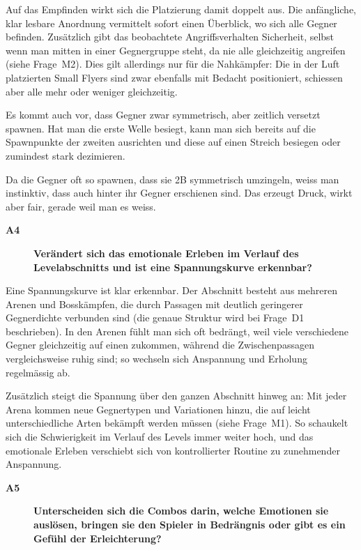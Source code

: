 \documentclass[../Main.tex]{subfiles}
\begin{document}
Auf das Empfinden wirkt sich die Platzierung damit doppelt aus. Die anfängliche, klar lesbare Anordnung vermittelt sofort einen Überblick, wo sich alle Gegner befinden. Zusätzlich gibt das beobachtete Angriffsverhalten Sicherheit, selbst wenn man mitten in einer Gegnergruppe steht, da nie alle gleichzeitig angreifen (siehe Frage~M2). Dies gilt allerdings nur für die Nahkämpfer: Die in der Luft platzierten Small Flyers sind zwar ebenfalls mit Bedacht positioniert, schiessen aber alle mehr oder weniger gleichzeitig.

Es kommt auch vor, dass Gegner zwar symmetrisch, aber zeitlich versetzt spawnen. Hat man die erste Welle besiegt, kann man sich bereits auf die Spawnpunkte der zweiten ausrichten und diese auf einen Streich besiegen oder zumindest stark dezimieren.

Da die Gegner oft so spawnen, dass sie 2B symmetrisch umzingeln, weiss man instinktiv, dass auch hinter ihr Gegner erschienen sind. Das erzeugt Druck, wirkt aber fair, gerade weil man es weiss.

\begin{description}
    \item[\textbf{A4}] \textbf{Verändert sich das emotionale Erleben im Verlauf des Levelabschnitts und ist eine Spannungskurve erkennbar?}
\end{description}

Eine Spannungskurve ist klar erkennbar. Der Abschnitt besteht aus mehreren Arenen und Bosskämpfen, die durch Passagen mit deutlich geringerer Gegnerdichte verbunden sind (die genaue Struktur wird bei Frage~D1 beschrieben). In den Arenen fühlt man sich oft bedrängt, weil viele verschiedene Gegner gleichzeitig auf einen zukommen, während die Zwischenpassagen vergleichsweise ruhig sind; so wechseln sich Anspannung und Erholung regelmässig ab.

Zusätzlich steigt die Spannung über den ganzen Abschnitt hinweg an: Mit jeder Arena kommen neue Gegnertypen und Variationen hinzu, die auf leicht unterschiedliche Arten bekämpft werden müssen (siehe Frage~M1). So schaukelt sich die Schwierigkeit im Verlauf des Levels immer weiter hoch, und das emotionale Erleben verschiebt sich von kontrollierter Routine zu zunehmender Anspannung.

\begin{description}
    \item[\textbf{A5}] \textbf{Unterscheiden sich die Combos darin, welche Emotionen sie auslösen, bringen sie den Spieler in Bedrängnis oder gibt es ein Gefühl der Erleichterung?}
\end{description}
\end{document}

